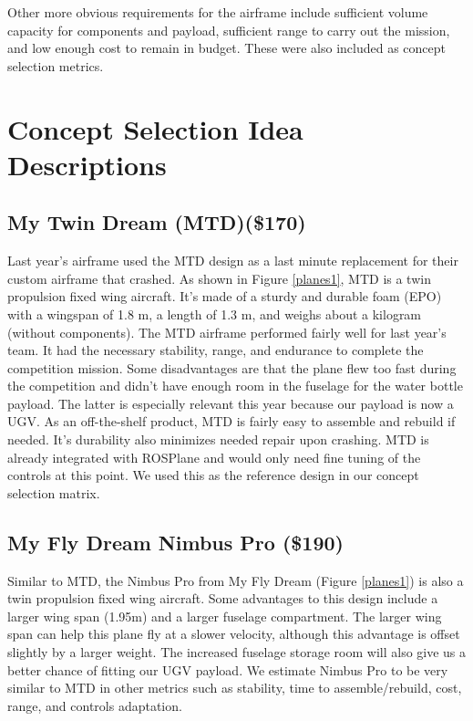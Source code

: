 \documentclass[]{auvsi_doc}
\begin{document}
Other more obvious requirements for the airframe include sufficient volume capacity for components and payload, sufficient range to carry out the mission, and low enough cost to remain in budget. These were also included as concept selection metrics.

\section*{Concept Selection Idea Descriptions}

\subsection*{My Twin Dream (MTD)(\$170)}

Last year's airframe used the MTD design as a last minute replacement for their custom airframe that crashed. As shown in Figure \ref{planes1}, MTD is a twin propulsion fixed wing aircraft. It's made of a sturdy and durable foam (EPO) with a wingspan of 1.8  m, a length of 1.3 m, and weighs about a kilogram (without components). The MTD airframe performed fairly well for last year's team. It had the necessary stability, range, and endurance to complete the competition mission. Some disadvantages are that the plane flew too fast during the competition and didn't have enough room in the fuselage for the water bottle payload. The latter is especially relevant this year because our payload is now a UGV. As an off-the-shelf product, MTD is fairly easy to assemble and rebuild if needed. It's durability also minimizes needed repair upon crashing. MTD is already integrated with ROSPlane and would only need fine tuning of the controls at this point. We used this as the reference design in our concept selection matrix.

\subsection*{My Fly Dream Nimbus Pro (\$190)}

Similar to MTD, the Nimbus Pro from My Fly Dream (Figure \ref{planes1}) is also a twin propulsion fixed wing aircraft. Some advantages to this design include a larger wing span (1.95m) and a larger fuselage compartment. The larger wing span can help this plane fly at a slower velocity, although this advantage is offset slightly by a larger weight. The increased fuselage storage room will also give us a better chance of fitting our UGV payload. We estimate Nimbus Pro to be very similar to MTD in other metrics such as stability, time to assemble/rebuild, cost, range, and controls adaptation.
\end{document}
